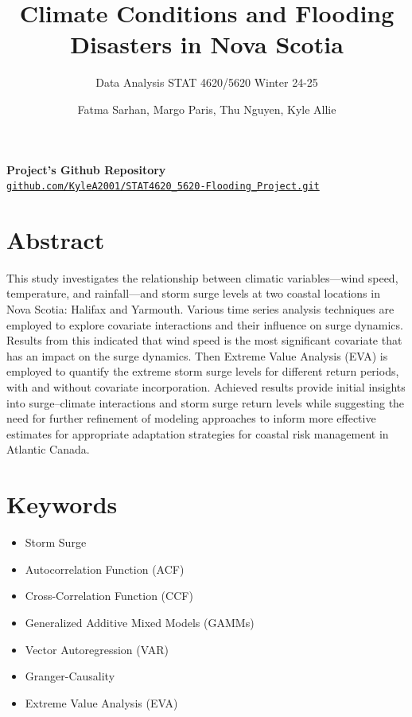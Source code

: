 \documentclass[
  letterpaper,
  DIV=11,
  numbers=noendperiod]{scrartcl}
\title{Climate Conditions and Flooding Disasters in Nova Scotia}
\subtitle{Data Analysis STAT 4620/5620 Winter 24-25}
\author{Fatma Sarhan, Margo Paris, Thu Nguyen, Kyle Allie}
\date{}
\providecommand{\tightlist}{%
  \setlength{\itemsep}{0pt}\setlength{\parskip}{0pt}}\usepackage{longtable,booktabs,array}
\begin{document}
\maketitle

\begin{center}
  \vspace{2mm}
  \textbf{Project's Github Repository} \\
  \texttt{\href{https://github.com/KyleA2001/STAT4620_5620-Flooding_Project.git}{github.com/KyleA2001/STAT4620\_5620-Flooding\_Project.git}}
\end{center}

\newpage

\section{Abstract}\label{abstract}

This study investigates the relationship between climatic
variables---wind speed, temperature, and rainfall---and storm surge
levels at two coastal locations in Nova Scotia: Halifax and Yarmouth.
Various time series analysis techniques are employed to explore
covariate interactions and their influence on surge dynamics. Results
from this indicated that wind speed is the most significant covariate
that has an impact on the surge dynamics. Then Extreme Value Analysis
(EVA) is employed to quantify the extreme storm surge levels for
different return periods, with and without covariate incorporation.
Achieved results provide initial insights into surge--climate
interactions and storm surge return levels while suggesting the need for
further refinement of modeling approaches to inform more effective
estimates for appropriate adaptation strategies for coastal risk
management in Atlantic Canada.

\section{Keywords}\label{keywords}

\begin{itemize}
\tightlist
\item
  Storm Surge
\item
  Autocorrelation Function (ACF)
\item
  Cross-Correlation Function (CCF)
\item
  Generalized Additive Mixed Models (GAMMs)
\item
  Vector Autoregression (VAR)
\item
  Granger-Causality
\item
  Extreme Value Analysis (EVA)
\end{itemize}
\end{document}
